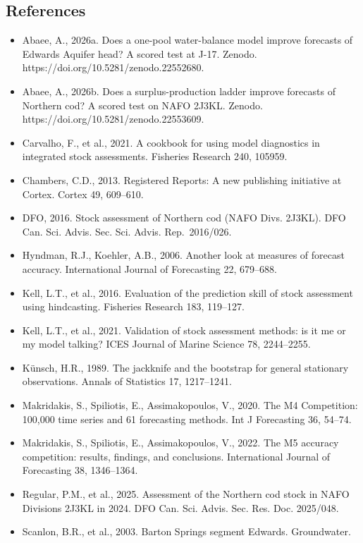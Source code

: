 \documentclass[11pt]{article}
\begin{document}
\subsection{References}\label{references}

\begin{itemize}
\item
  Abaee, A., 2026a. Does a one-pool water-balance model improve
  forecasts of Edwards Aquifer head? A scored test at J-17. Zenodo.
  https://doi.org/10.5281/zenodo.22552680.
\item
  Abaee, A., 2026b. Does a surplus-production ladder improve forecasts
  of Northern cod? A scored test on NAFO 2J3KL. Zenodo.
  https://doi.org/10.5281/zenodo.22553609.
\item
  Carvalho, F., et al., 2021. A cookbook for using model diagnostics in
  integrated stock assessments. Fisheries Research 240, 105959.
\item
  Chambers, C.D., 2013. Registered Reports: A new publishing initiative
  at Cortex. Cortex 49, 609--610.
\item
  DFO, 2016. Stock assessment of Northern cod (NAFO Divs. 2J3KL). DFO
  Can. Sci. Advis. Sec. Sci. Advis. Rep.~2016/026.
\item
  Hyndman, R.J., Koehler, A.B., 2006. Another look at measures of
  forecast accuracy. International Journal of Forecasting 22, 679--688.
\item
  Kell, L.T., et al., 2016. Evaluation of the prediction skill of stock
  assessment using hindcasting. Fisheries Research 183, 119--127.
\item
  Kell, L.T., et al., 2021. Validation of stock assessment methods: is
  it me or my model talking? ICES Journal of Marine Science 78,
  2244--2255.
\item
  Künsch, H.R., 1989. The jackknife and the bootstrap for general
  stationary observations. Annals of Statistics 17, 1217--1241.
\item
  Makridakis, S., Spiliotis, E., Assimakopoulos, V., 2020. The M4
  Competition: 100,000 time series and 61 forecasting methods. Int J
  Forecasting 36, 54--74.
\item
  Makridakis, S., Spiliotis, E., Assimakopoulos, V., 2022. The M5
  accuracy competition: results, findings, and conclusions.
  International Journal of Forecasting 38, 1346--1364.
\item
  Regular, P.M., et al., 2025. Assessment of the Northern cod stock in
  NAFO Divisions 2J3KL in 2024. DFO Can. Sci. Advis. Sec. Res. Doc.
  2025/048.
\item
  Scanlon, B.R., et al., 2003. Barton Springs segment Edwards.
  Groundwater.
\end{itemize}
\end{document}
